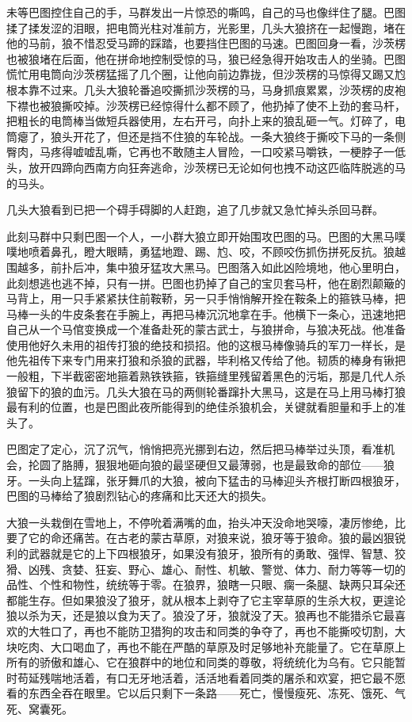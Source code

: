 \par 未等巴图控住自己的手，马群发出一片惊恐的嘶鸣，自己的马也像绊住了腿。巴图揉了揉发涩的泪眼，把电筒光柱对准前方，光影里，几头大狼挤在一起慢跑，堵在他的马前，狼不惜忍受马蹄的踩踏，也要挡住巴图的马速。巴图回身一看，沙茨楞也被狼堵在后面，他在拼命地控制受惊的马，狼已经急得开始攻击人的坐骑。巴图慌忙用电筒向沙茨楞猛摇了几个圈，让他向前边靠拢，但沙茨楞的马惊得又踢又尥根本靠不过来。几头大狼轮番追咬撕抓沙茨楞的马，马身抓痕累累，沙茨楞的皮袍下襟也被狼撕咬掉。沙茨楞已经惊得什么都不顾了，他扔掉了使不上劲的套马杆，把粗长的电筒棒当做短兵器使用，左右开弓，向扑上来的狼乱砸一气。灯碎了，电筒瘪了，狼头开花了，但还是挡不住狼的车轮战。一条大狼终于撕咬下马的一条侧臀肉，马疼得嘘嘘乱嘶，它再也不敢随主人冒险，一口咬紧马嚼铁，一梗脖子一低头，放开四蹄向西南方向狂奔逃命，沙茨楞已无论如何也拽不动这匹临阵脱逃的马的马头。
\par 几头大狼看到已把一个碍手碍脚的人赶跑，追了几步就又急忙掉头杀回马群。
\par 此刻马群中只剩巴图一个人，一小群大狼立即开始围攻巴图的马。巴图的大黑马噗噗地喷着鼻孔，瞪大眼睛，勇猛地蹬、踢、尥、咬，不顾咬伤抓伤拼死反抗。狼越围越多，前扑后冲，集中狼牙猛攻大黑马。巴图落入如此凶险境地，他心里明白，此刻想逃也逃不掉，只有一拼。巴图也扔掉了自己的宝贝套马杆，他在剧烈颠簸的马背上，用一只手紧紧扶住前鞍鞒，另一只手悄悄解开拴在鞍条上的箍铁马棒，把马棒一头的牛皮条套在手腕上，再把马棒沉沉地拿在手。他横下一条心，迅速地把自己从一个马倌变换成一个准备赴死的蒙古武士，与狼拼命，与狼决死战。他准备使用他好久未用的祖传打狼的绝技和损招。他的这根马棒像骑兵的军刀一样长，是他先祖传下来专门用来打狼和杀狼的武器，毕利格又传给了他。韧质的棒身有锹把一般粗，下半截密密地箍着熟铁铁箍，铁箍缝里残留着黑色的污垢，那是几代人杀狼留下的狼的血污。几头大狼在马的两侧轮番蹿扑大黑马，这是在马上用马棒打狼最有利的位置，也是巴图此夜所能得到的绝佳杀狼机会，关键就看胆量和手上的准头了。
\par 巴图定了定心，沉了沉气，悄悄把亮光挪到右边，然后把马棒举过头顶，看准机会，抡圆了胳膊，狠狠地砸向狼的最坚硬但又最薄弱，也是最致命的部位——狼牙。一头向上猛蹿，张牙舞爪的大狼，被向下猛击的马棒迎头齐根打断四根狼牙，巴图的马棒给了狼剧烈钻心的疼痛和比天还大的损失。
\par 大狼一头栽倒在雪地上，不停吮着满嘴的血，抬头冲天没命地哭嚎，凄厉惨绝，比要了它的命还痛苦。在古老的蒙古草原，对狼来说，狼牙等于狼命。狼的最凶狠锐利的武器就是它的上下四根狼牙，如果没有狼牙，狼所有的勇敢、强悍、智慧、狡猾、凶残、贪婪、狂妄、野心、雄心、耐性、机敏、警觉、体力、耐力等等一切的品性、个性和物性，统统等于零。在狼界，狼瞎一只眼、瘸一条腿、缺两只耳朵还都能生存。但如果狼没了狼牙，就从根本上剥夺了它主宰草原的生杀大权，更遑论狼以杀为天，还是狼以食为天了。狼没了牙，狼就没了天。狼再也不能猎杀它最喜欢的大牲口了，再也不能防卫猎狗的攻击和同类的争夺了，再也不能撕咬切割，大块吃肉、大口喝血了，再也不能在严酷的草原及时足够地补充能量了。它在草原上所有的骄傲和雄心、它在狼群中的地位和同类的尊敬，将统统化为乌有。它只能暂时苟延残喘地活着，有口无牙地活着，活活地看着同类的屠杀和欢宴，把它最不愿看的东西全吞在眼里。它以后只剩下一条路——死亡，慢慢瘦死、冻死、饿死、气死、窝囊死。

